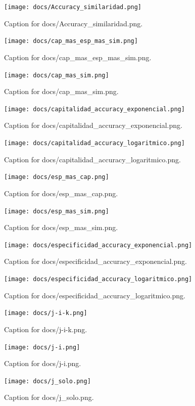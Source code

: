\documentclass{article}
\begin{document}
\begin{figure}[h] \centering \texttt{[image: docs/Accuracy\_similaridad.png]} \caption{Caption for docs/Accuracy_similaridad.png.} \end{figure}
\begin{figure}[h] \centering \texttt{[image: docs/cap\_mas\_esp\_mas\_sim.png]} \caption{Caption for docs/cap_mas_esp_mas_sim.png.} \end{figure}
\begin{figure}[h] \centering \texttt{[image: docs/cap\_mas\_sim.png]} \caption{Caption for docs/cap_mas_sim.png.} \end{figure}
\begin{figure}[h] \centering \texttt{[image: docs/capitalidad\_accuracy\_exponencial.png]} \caption{Caption for docs/capitalidad_accuracy_exponencial.png.} \end{figure}
\begin{figure}[h] \centering \texttt{[image: docs/capitalidad\_accuracy\_logaritmico.png]} \caption{Caption for docs/capitalidad_accuracy_logaritmico.png.} \end{figure}
\begin{figure}[h] \centering \texttt{[image: docs/esp\_mas\_cap.png]} \caption{Caption for docs/esp_mas_cap.png.} \end{figure}
\begin{figure}[h] \centering \texttt{[image: docs/esp\_mas\_sim.png]} \caption{Caption for docs/esp_mas_sim.png.} \end{figure}
\begin{figure}[h] \centering \texttt{[image: docs/especificidad\_accuracy\_exponencial.png]} \caption{Caption for docs/especificidad_accuracy_exponencial.png.} \end{figure}
\begin{figure}[h] \centering \texttt{[image: docs/especificidad\_accuracy\_logaritmico.png]} \caption{Caption for docs/especificidad_accuracy_logaritmico.png.} \end{figure}
\begin{figure}[h] \centering \texttt{[image: docs/j-i-k.png]} \caption{Caption for docs/j-i-k.png.} \end{figure}
\begin{figure}[h] \centering \texttt{[image: docs/j-i.png]} \caption{Caption for docs/j-i.png.} \end{figure}
\begin{figure}[h] \centering \texttt{[image: docs/j\_solo.png]} \caption{Caption for docs/j_solo.png.} \end{figure}
\end{document}
